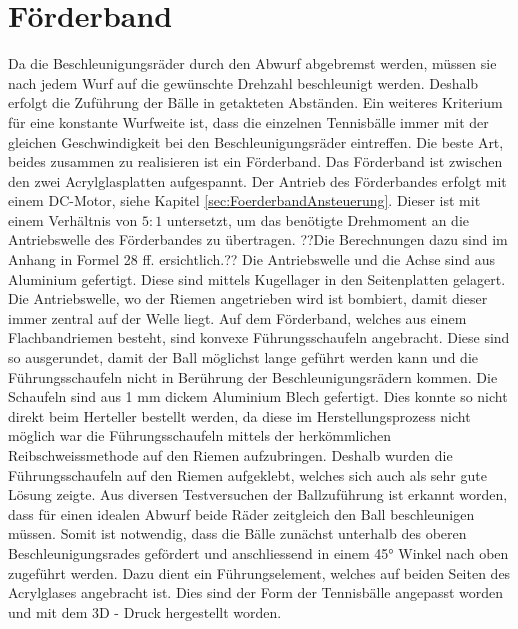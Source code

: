 \section{Förderband}
\label{sec:Foerderband}
	Da die Beschleunigungsräder durch den Abwurf abgebremst werden, müssen sie nach jedem 
	Wurf auf die gewünschte Drehzahl beschleunigt werden. Deshalb erfolgt die 
	Zuführung der Bälle in getakteten Abständen. Ein weiteres Kriterium für eine 
	konstante Wurfweite ist, dass die einzelnen Tennisbälle immer mit der gleichen Geschwindigkeit bei den Beschleunigungsräder eintreffen. Die beste Art, beides 
	zusammen zu realisieren ist ein Förderband. Das Förderband ist zwischen den zwei 
	Acrylglasplatten aufgespannt. Der Antrieb des Förderbandes erfolgt mit 
	einem DC-Motor, siehe Kapitel \ref{sec:FoerderbandAnsteuerung}. Dieser 
	ist mit einem Verhältnis von  $5:1$ untersetzt, um das benötigte Drehmoment 
	an die Antriebswelle des Förderbandes zu übertragen. ??Die Berechnungen dazu 
	sind im Anhang in Formel 28 ff. ersichtlich.?? Die Antriebswelle und die Achse 
	sind aus Aluminium gefertigt. Diese sind mittels Kugellager in den Seitenplatten gelagert. Die Antriebswelle, wo der Riemen angetrieben wird ist bombiert, 
	damit dieser immer zentral auf der Welle liegt. Auf dem Förderband, welches 
	aus einem Flachbandriemen besteht, sind konvexe Führungsschaufeln angebracht. 
	Diese sind so ausgerundet, damit der Ball möglichst lange geführt werden kann 
	und die Führungsschaufeln nicht in Berührung der Beschleunigungsrädern kommen. 
	Die Schaufeln sind aus 1 mm dickem Aluminium Blech gefertigt. Dies konnte so 
	nicht direkt beim Herteller bestellt werden, da diese im Herstellungsprozess 
	nicht möglich war die Führungsschaufeln mittels der herkömmlichen 
	Reibschweissmethode auf den Riemen aufzubringen. Deshalb wurden die 
	Führungsschaufeln auf den Riemen aufgeklebt, welches sich auch als sehr gute 
	Lösung zeigte. Aus diversen Testversuchen der Ballzuführung ist erkannt worden, 
	dass für einen idealen Abwurf beide Räder zeitgleich den Ball beschleunigen 
	müssen. Somit ist notwendig, dass die Bälle zunächst unterhalb des oberen Beschleunigungsrades gefördert und anschliessend in einem 45° Winkel nach oben 
	zugeführt werden. Dazu dient ein Führungselement, welches auf beiden Seiten des 
	Acrylglases angebracht ist. Dies sind der Form der Tennisbälle angepasst worden 
	und mit dem 3D - Druck hergestellt worden.

